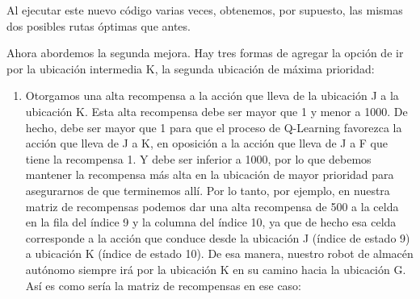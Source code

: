 \documentclass[
]{book}
\providecommand{\tightlist}{%
  \setlength{\itemsep}{0pt}\setlength{\parskip}{0pt}}
\begin{document}
Al ejecutar este nuevo código varias veces, obtenemos, por supuesto, las mismas dos posibles rutas óptimas que antes.

Ahora abordemos la segunda mejora. Hay tres formas de agregar la opción de ir por la ubicación intermedia K, la segunda ubicación de máxima prioridad:

\begin{enumerate}
\def\labelenumi{\arabic{enumi}.}
\tightlist
\item
  Otorgamos una alta recompensa a la acción que lleva de la ubicación J a la ubicación K. Esta alta recompensa debe ser mayor que 1 y menor a 1000. De hecho, debe ser mayor que 1 para que el proceso de Q-Learning favorezca la acción que lleva de J a K, en oposición a la acción que lleva de J a F que tiene la recompensa 1. Y debe ser inferior a 1000, por lo que debemos mantener la recompensa más alta en la ubicación de mayor prioridad para asegurarnos de que terminemos allí. Por lo tanto, por ejemplo, en nuestra matriz de recompensas podemos dar una alta recompensa de 500 a la celda en la fila del índice 9 y la columna del índice 10, ya que de hecho esa celda corresponde a la acción que conduce desde la ubicación J (índice de estado 9) a ubicación K (índice de estado 10). De esa manera, nuestro robot de almacén autónomo siempre irá por la ubicación K en su camino hacia la ubicación G. Así es como sería la matriz de recompensas en ese caso:
\end{enumerate}
\end{document}
